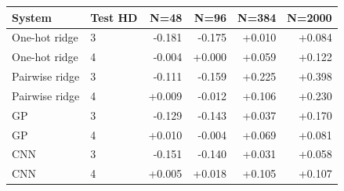 \begin{tabular}{llrrrr}
\toprule
System & Test HD & N=48 & N=96 & N=384 & N=2000 \\
\midrule
One-hot ridge & 3 & -0.181 & -0.175 & +0.010 & +0.084 \\
One-hot ridge & 4 & -0.004 & +0.000 & +0.059 & +0.122 \\
Pairwise ridge & 3 & -0.111 & -0.159 & +0.225 & +0.398 \\
Pairwise ridge & 4 & +0.009 & -0.012 & +0.106 & +0.230 \\
GP & 3 & -0.129 & -0.143 & +0.037 & +0.170 \\
GP & 4 & +0.010 & -0.004 & +0.069 & +0.081 \\
CNN & 3 & -0.151 & -0.140 & +0.031 & +0.058 \\
CNN & 4 & +0.005 & +0.018 & +0.105 & +0.107 \\
\bottomrule
\end{tabular}
